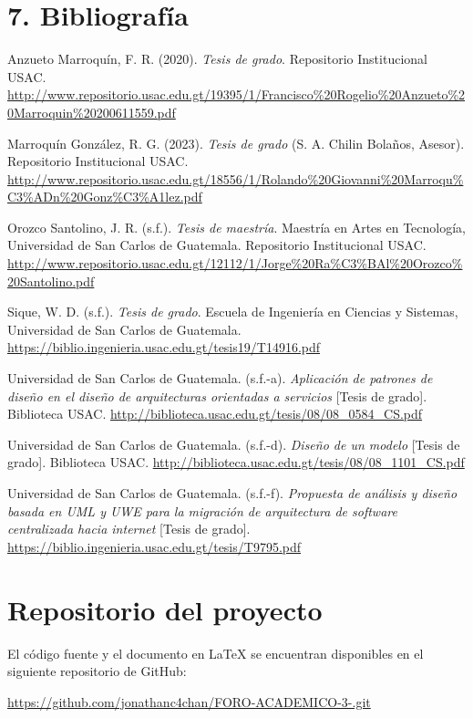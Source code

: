 \documentclass[12pt,letterpaper]{article}
\begin{document}
\section*{7. Bibliografía}

\hangindent=1cm \noindent Anzueto Marroquín, F. R. (2020). \textit{Tesis de grado}. Repositorio Institucional USAC. \url{http://www.repositorio.usac.edu.gt/19395/1/Francisco%20Rogelio%20Anzueto%20Marroquin%20200611559.pdf}

\vspace{4pt}
\hangindent=1cm \noindent Marroquín González, R. G. (2023). \textit{Tesis de grado} (S. A. Chilin Bolaños, Asesor). Repositorio Institucional USAC. \url{http://www.repositorio.usac.edu.gt/18556/1/Rolando%20Giovanni%20Marroqu%C3%ADn%20Gonz%C3%A1lez.pdf}

\vspace{4pt}
\hangindent=1cm \noindent Orozco Santolino, J. R. (s.f.). \textit{Tesis de maestría}. Maestría en Artes en Tecnología, Universidad de San Carlos de Guatemala. Repositorio Institucional USAC. \url{http://www.repositorio.usac.edu.gt/12112/1/Jorge%20Ra%C3%BAl%20Orozco%20Santolino.pdf}

\vspace{4pt}
\hangindent=1cm \noindent Sique, W. D. (s.f.). \textit{Tesis de grado}. Escuela de Ingeniería en Ciencias y Sistemas, Universidad de San Carlos de Guatemala. \url{https://biblio.ingenieria.usac.edu.gt/tesis19/T14916.pdf}

\vspace{4pt}
\hangindent=1cm \noindent Universidad de San Carlos de Guatemala. (s.f.-a). \textit{Aplicación de patrones de diseño en el diseño de arquitecturas orientadas a servicios} [Tesis de grado]. Biblioteca USAC. \url{http://biblioteca.usac.edu.gt/tesis/08/08_0584_CS.pdf}

\vspace{4pt}
\hangindent=1cm \noindent Universidad de San Carlos de Guatemala. (s.f.-d). \textit{Diseño de un modelo} [Tesis de grado]. Biblioteca USAC. \url{http://biblioteca.usac.edu.gt/tesis/08/08_1101_CS.pdf}

\vspace{4pt}
\hangindent=1cm \noindent Universidad de San Carlos de Guatemala. (s.f.-f). \textit{Propuesta de análisis y diseño basada en UML y UWE para la migración de arquitectura de software centralizada hacia internet} [Tesis de grado]. \url{https://biblio.ingenieria.usac.edu.gt/tesis/T9795.pdf}

\section*{Repositorio del proyecto}

El código fuente y el documento en \LaTeX{} se encuentran disponibles en el siguiente repositorio de GitHub:

\url{https://github.com/jonathanc4chan/FORO-ACADEMICO-3-.git}
\end{document}
